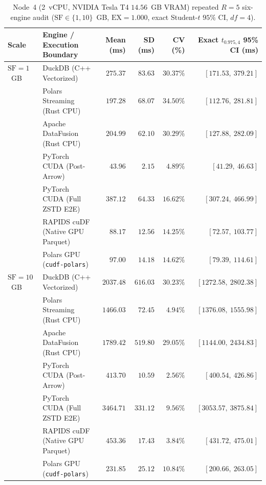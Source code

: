 \documentclass[10pt,a4paper]{article}
\begin{document}
\begin{table}[!t]
\centering
\caption{Node~4 (2~vCPU, NVIDIA Tesla T4 $14.56$~GB VRAM) repeated $R=5$ six-engine audit ($\text{SF}\in\{1,10\}$~GB, $\text{EX}=1.000$, exact Student-$t$ $95\%$ CI, $df=4$).}
\label{tab:v13_groupB_node4_t4_r5}
\scriptsize
\setlength{\tabcolsep}{4.0pt}
\renewcommand{\arraystretch}{1.10}
\begin{tabular}{@{}llrrrr@{}}
\toprule
\textbf{Scale} & \textbf{Engine / Execution Boundary} & \textbf{Mean (ms)} & \textbf{SD (ms)} & \textbf{CV (\%)} & \textbf{Exact $t_{0.975,4}$ 95\% CI (ms)} \\
\midrule
$\text{SF}=1$~GB & DuckDB (C++ Vectorized) & $275.37$ & $83.63$ & $30.37\%$ & $[171.53,\ 379.21]$ \\
 & Polars Streaming (Rust CPU) & $197.28$ & $68.07$ & $34.50\%$ & $[112.76,\ 281.81]$ \\
 & Apache DataFusion (Rust CPU) & $204.99$ & $62.10$ & $30.29\%$ & $[127.88,\ 282.09]$ \\
 & PyTorch CUDA (Post-Arrow) & $43.96$ & $2.15$ & $4.89\%$ & $[41.29,\ 46.63]$ \\
 & PyTorch CUDA (Full ZSTD E2E) & $387.12$ & $64.33$ & $16.62\%$ & $[307.24,\ 466.99]$ \\
 & RAPIDS cuDF (Native GPU Parquet) & $88.17$ & $12.56$ & $14.25\%$ & $[72.57,\ 103.77]$ \\
 & Polars GPU (\texttt{cudf-polars}) & $97.00$ & $14.18$ & $14.62\%$ & $[79.39,\ 114.61]$ \\
\midrule
$\text{SF}=10$~GB & DuckDB (C++ Vectorized) & $2037.48$ & $616.03$ & $30.23\%$ & $[1272.58,\ 2802.38]$ \\
 & Polars Streaming (Rust CPU) & $1466.03$ & $72.45$ & $4.94\%$ & $[1376.08,\ 1555.98]$ \\
 & Apache DataFusion (Rust CPU) & $1789.42$ & $519.80$ & $29.05\%$ & $[1144.00,\ 2434.83]$ \\
 & PyTorch CUDA (Post-Arrow) & $413.70$ & $10.59$ & $2.56\%$ & $[400.54,\ 426.86]$ \\
 & PyTorch CUDA (Full ZSTD E2E) & $3464.71$ & $331.12$ & $9.56\%$ & $[3053.57,\ 3875.84]$ \\
 & RAPIDS cuDF (Native GPU Parquet) & $453.36$ & $17.43$ & $3.84\%$ & $[431.72,\ 475.01]$ \\
 & Polars GPU (\texttt{cudf-polars}) & $231.85$ & $25.12$ & $10.84\%$ & $[200.66,\ 263.05]$ \\
\bottomrule
\end{tabular}
\end{table}
\end{document}
